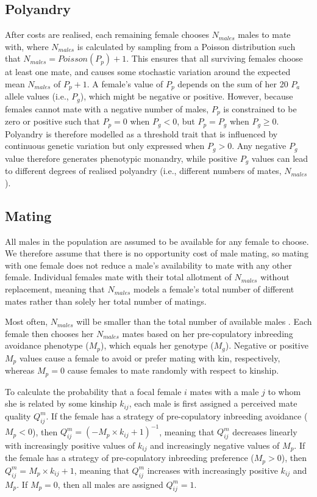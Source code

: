 \documentclass[10pt,letterpaper]{article}
\begin{document}
\subsection*{Polyandry}

After costs are realised, each remaining female chooses $N_{males}$ males to mate with, where $N_{males}$ is calculated by sampling from a Poisson distribution such that $N_{males} = Poisson(P_{p}) + 1$. This ensures that all surviving females choose at least one mate, and causes some stochastic variation around the expected mean $N_{males}$ of $P_{p}+1$. A female's value of $P_{p}$ depends on the sum of her 20 $P_{a}$ allele values (i.e., $P_{g}$), which might be negative or positive. However, because females cannot mate with a negative number of males, $P_{p}$ is constrained to be zero or positive such that $P_{p} = 0$ when $P_{g} < 0$, but $P_{p} = P_{g}$ when $P_{g} \geq 0$. Polyandry is therefore modelled as a threshold trait \cite[][]{Lynch1998, Roff1996, Roff1998, Duthie} that is influenced by continuous genetic variation but only expressed when $P_{g} > 0$. Any negative $P_{g}$ value therefore generates phenotypic monandry, while positive $P_{g}$ values can lead to different degrees of realised polyandry (i.e., different numbers of mates, $N_{males}$).

\subsection*{Mating}

All males in the population are assumed to be available for any female to choose. We therefore assume that there is no opportunity cost of male mating, so mating with one female does not reduce a male's availability to mate with any other female. Individual females mate with their total allotment of $N_{males}$ without replacement, meaning that $N_{males}$ models a female's total number of different mates rather than solely her total number of matings.

Most often, $N_{males}$ will be smaller than the total number of available males \cite[][]{Duthie}. Each female then chooses her $N_{males}$ mates based on her pre-copulatory inbreeding avoidance phenotype ($M_{p}$), which equals her genotype ($M_{g}$). Negative or positive $M_{p}$ values cause a female to avoid or prefer mating with kin, respectively, whereas $M_{p}=0$ cause females to mate randomly with respect to kinship.

To calculate the probability that a focal female $i$ mates with a male $j$ to whom she is related by some kinship $k_{ij}$, each male is first assigned a perceived mate quality $Q^{m}_{ij}$. If the female has a strategy of pre-copulatory inbreeding avoidance ($M_{p}<0$), then $Q^{m}_{ij} = (-M_{p} \times k_{ij} + 1)^{-1}$, meaning that $Q^{m}_{ij}$ decreases linearly with increasingly positive values of $k_{ij}$ and increasingly negative values of $M_{p}$. If the female has a strategy of pre-copulatory inbreeding preference ($M_{p}>0$), then $Q^{m}_{ij} = M_{p} \times k_{ij} + 1$, meaning that $Q^{m}_{ij}$ increases with increasingly positive $k_{ij}$ and $M_{p}$. If $M_{p}=0$, then all males are assigned $Q^{m}_{ij}=1$.
\end{document}
